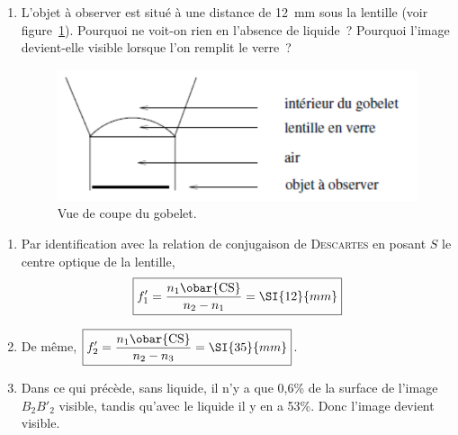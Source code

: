 \documentclass[a4paper, 10pt, garamond, oneside]{book}
\begin{document}
{\begin{enumerate}
		\item L'objet à observer est situé à une distance de \SI{12}{mm} sous la
		      lentille (voir figure~\ref{fig:coupe}). Pourquoi ne voit-on rien en
		      l'absence de liquide~? Pourquoi l'image devient-elle visible lorsque
		      l'on remplit le verre~?
		      \begin{figure}[htbp]
			      \centering
			      \includegraphics[width=.45\linewidth]{fig5}
			      \caption{Vue de coupe du gobelet.}
			      \label{fig:coupe}
		      \end{figure}
	\end{enumerate}
}{
	\begin{enumerate}
    \item Par identification avec la relation de conjugaison de
          \textsc{Descartes} en posant $S$ le centre optique de la lentille,
		      \[
			      \boxed{f'_1=\frac{n_1\obar{\rm CS}}{n_2-n_1}=\SI{12}{mm}}
		      \]
		\item De même, $\boxed{f'_2=\frac{n_1\obar{\rm CS}}{n_2-n_3}=\SI{35}{mm}}$.
		\item Dans ce qui précède, sans liquide, il n'y a que 0,6\% de la surface de
		      l'image $B_2B'_2$ visible, tandis qu'avec le liquide il y en a 53\%. Donc
		      l'image devient visible.
	\end{enumerate}
}
\end{document}
